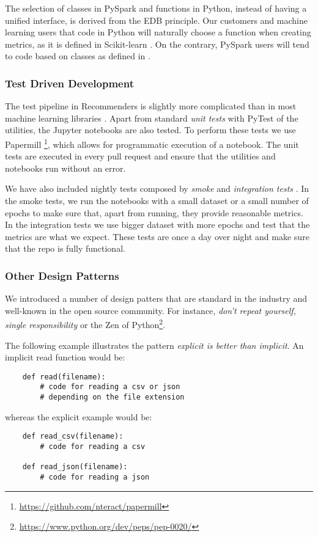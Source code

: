 The selection of classes in PySpark and functions in Python, instead of having a unified
interface, is derived from the EDB principle. Our customers and machine learning users
that code in Python will naturally choose a function when creating metrics, as it is
defined in Scikit-learn \cite{pedregosa2011scikit}. On the contrary, PySpark users 
will tend to code based on classes as defined in \cite{meng2016mllib}. 

\subsubsection{Test Driven Development}

The test pipeline in Recommenders is slightly more complicated than in most machine learning
libraries \cite{abadi2016tensorflow,paszke2017automatic,pedregosa2011scikit,ke2017lightgbm}.
Apart from standard {\em unit tests} with PyTest \cite{krekel2004pytest} of the utilities, 
the Jupyter notebooks are also tested. To perform these tests we use Papermill 
\footnote{\url{https://github.com/nteract/papermill}}, which allows for programmatic execution of a notebook. The
unit tests are executed in every pull request and ensure that the utilities and 
notebooks run without an error.

We have also included nightly tests composed by {\em smoke} and {\em integration tests}
\cite{gonzalez-fierro2018beginners}. In the smoke tests, we run the notebooks with a 
small dataset or a small number of epochs to make sure that, apart from running, they 
provide reasonable metrics. In the integration tests we use bigger dataset with more 
epochs and test that the metrics are what we expect. These tests are once a day over 
night and make sure that the repo is fully functional.

\subsubsection{Other Design Patterns}

We introduced a number of design patters that are standard in the industry and well-known
in the open source community. For instance, \textit{don't repeat yourself}, \textit{single
responsibility} or the Zen of Python\footnote{\url{https://www.python.org/dev/peps/pep-0020/}}. 

The following example illustrates the pattern \textit{explicit is better than implicit}.
An implicit read function would be: 
\begin{verbatim}
    def read(filename):
        # code for reading a csv or json
        # depending on the file extension
\end{verbatim}

whereas the explicit example would be:
\begin{verbatim}
    def read_csv(filename):
        # code for reading a csv

    def read_json(filename):
        # code for reading a json
\end{verbatim}



